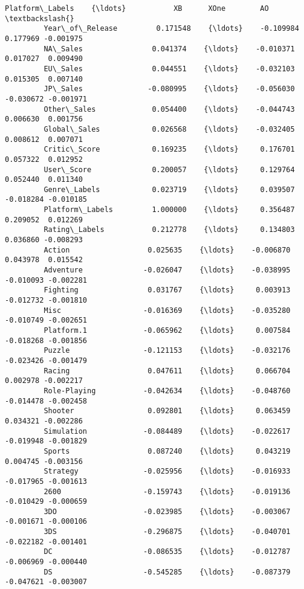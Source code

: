 \documentclass[11pt]{article}
\begin{document}
\begin{Verbatim}[commandchars=\\\{\}]
                          Platform\_Labels    {\ldots}           XB      XOne        AO  \textbackslash{}
         Year\_of\_Release         0.171548    {\ldots}    -0.109984  0.177969 -0.001975   
         NA\_Sales                0.041374    {\ldots}    -0.010371  0.017027  0.009490   
         EU\_Sales                0.044551    {\ldots}    -0.032103  0.015305  0.007140   
         JP\_Sales               -0.080995    {\ldots}    -0.056030 -0.030672 -0.001971   
         Other\_Sales             0.054400    {\ldots}    -0.044743  0.006630  0.001756   
         Global\_Sales            0.026568    {\ldots}    -0.032405  0.008612  0.007071   
         Critic\_Score            0.169235    {\ldots}     0.176701  0.057322  0.012952   
         User\_Score              0.200057    {\ldots}     0.129764  0.052440  0.011340   
         Genre\_Labels            0.023719    {\ldots}     0.039507 -0.018284 -0.010185   
         Platform\_Labels         1.000000    {\ldots}     0.356487  0.209052  0.012269   
         Rating\_Labels           0.212778    {\ldots}     0.134803  0.036860 -0.008293   
         Action                  0.025635    {\ldots}    -0.006870  0.043978  0.015542   
         Adventure              -0.026047    {\ldots}    -0.038995 -0.010093 -0.002281   
         Fighting                0.031767    {\ldots}     0.003913 -0.012732 -0.001810   
         Misc                   -0.016369    {\ldots}    -0.035280 -0.010749 -0.002651   
         Platform.1             -0.065962    {\ldots}     0.007584 -0.018268 -0.001856   
         Puzzle                 -0.121153    {\ldots}    -0.032176 -0.023426 -0.001479   
         Racing                  0.047611    {\ldots}     0.066704  0.002978 -0.002217   
         Role-Playing           -0.042634    {\ldots}    -0.048760 -0.014478 -0.002458   
         Shooter                 0.092801    {\ldots}     0.063459  0.034321 -0.002286   
         Simulation             -0.084489    {\ldots}    -0.022617 -0.019948 -0.001829   
         Sports                  0.087240    {\ldots}     0.043219  0.004745 -0.003156   
         Strategy               -0.025956    {\ldots}    -0.016933 -0.017965 -0.001613   
         2600                   -0.159743    {\ldots}    -0.019136 -0.010429 -0.000659   
         3DO                    -0.023985    {\ldots}    -0.003067 -0.001671 -0.000106   
         3DS                    -0.296875    {\ldots}    -0.040701 -0.022182 -0.001401   
         DC                     -0.086535    {\ldots}    -0.012787 -0.006969 -0.000440   
         DS                     -0.545285    {\ldots}    -0.087379 -0.047621 -0.003007   

\end{Verbatim}
\end{document}
